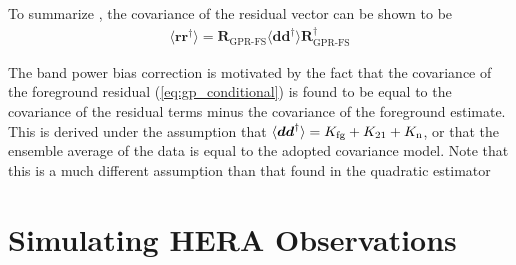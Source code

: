 \documentclass[a4paper,fleqn,usenatbib]{mnras}
\def\d{\boldsymbol{d}}
\def\r{\boldsymbol{r}}
\def\R{\boldsymbol{R}}
\def\Kto{K_{\rm 21}}
\def\Kfg{K_{\rm fg}}
\def\Kn{K_{\rm n}}
\begin{document}
To summarize , the covariance of the residual vector can be shown to be
\begin{align}
\label{eq:res_covariance}
\langle\r\r^\dagger\rangle = \R_{\operatorname{GPR-FS}}\langle\d\d^\dagger\rangle\R_{\operatorname{GPR-FS}}^\dagger
\end{align}


The band power bias correction is motivated by the fact that the covariance of the foreground residual (\autoref{eq:gp_conditional}) is found to be equal to the covariance of the residual terms minus the covariance of the foreground estimate.
This is derived under the assumption that $\langle \d \d^\dagger\rangle = \Kfg + \Kto + \Kn$, or that the ensemble average of the data is equal to the adopted covariance model.
Note that this is a much different assumption than that found in the quadratic estimator




\section{Simulating HERA Observations}
\label{sec:sims}
\end{document}
